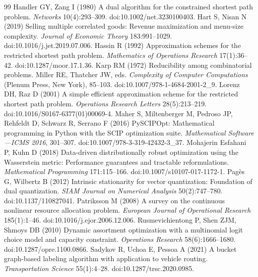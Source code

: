 \documentclass[11pt,letterpaper]{article}
\theoremstyle{definition}\newtheorem{remark}[theorem]{Remark}
\begin{document}
\begin{thebibliography}{99}
Handler GY, Zang I (1980) A dual algorithm for the constrained shortest path problem. \emph{Networks} 10(4):293--309. doi:10.1002/net.3230100403.
Hart S, Nisan N (2019) Selling multiple correlated goods: Revenue maximization and menu-size complexity. \emph{Journal of Economic Theory} 183:991--1029. doi:10.1016/j.jet.2019.07.006.
Hassin R (1992) Approximation schemes for the restricted shortest path problem. \emph{Mathematics of Operations Research} 17(1):36--42. doi:10.1287/moor.17.1.36.
Karp RM (1972) Reducibility among combinatorial problems. Miller RE, Thatcher JW, eds. \emph{Complexity of Computer Computations} (Plenum Press, New York), 85--103. doi:10.1007/978-1-4684-2001-2\_9.
Lorenz DH, Raz D (2001) A simple efficient approximation scheme for the restricted shortest path problem. \emph{Operations Research Letters} 28(5):213--219. doi:10.1016/S0167-6377(01)00069-4.
Maher S, Miltenberger M, Pedroso JP, Rehfeldt D, Schwarz R, Serrano F (2016) PySCIPOpt: Mathematical programming in Python with the SCIP optimization suite. \emph{Mathematical Software---ICMS 2016}, 301--307. doi:10.1007/978-3-319-42432-3\_37.
Mohajerin Esfahani P, Kuhn D (2018) Data-driven distributionally robust optimization using the Wasserstein metric: Performance guarantees and tractable reformulations. \emph{Mathematical Programming} 171:115--166. doi:10.1007/s10107-017-1172-1.
Pag\`es G, Wilbertz B (2012) Intrinsic stationarity for vector quantization: Foundation of dual quantization. \emph{SIAM Journal on Numerical Analysis} 50(2):747--780. doi:10.1137/110827041.
Patriksson M (2008) A survey on the continuous nonlinear resource allocation problem. \emph{European Journal of Operational Research} 185(1):1--46. doi:10.1016/j.ejor.2006.12.006.
Rusmevichientong P, Shen ZJM, Shmoys DB (2010) Dynamic assortment optimization with a multinomial logit choice model and capacity constraint. \emph{Operations Research} 58(6):1666--1680. doi:10.1287/opre.1100.0866.
Sadykov R, Uchoa E, Pessoa A (2021) A bucket graph-based labeling algorithm with application to vehicle routing. \emph{Transportation Science} 55(1):4--28. doi:10.1287/trsc.2020.0985.

\end{thebibliography}
\end{document}
